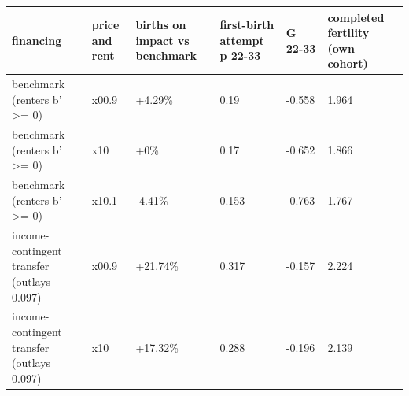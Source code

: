 \begingroup\small
\setlength{\tabcolsep}{3pt}
\renewcommand{\arraystretch}{1.04}
\begin{tabularx}{\linewidth}{XXXXXX}
\toprule
financing & price and rent & births on impact vs benchmark & first-birth attempt p 22-33 & G 22-33 & completed fertility (own cohort) \\
\midrule
benchmark (renters b' \textgreater{}= 0) & x00.9 & +4.29\% & 0.19 & -0.558 & 1.964 \\
benchmark (renters b' \textgreater{}= 0) & x10 & +0\% & 0.17 & -0.652 & 1.866 \\
benchmark (renters b' \textgreater{}= 0) & x10.1 & -4.41\% & 0.153 & -0.763 & 1.767 \\
income-contingent transfer (outlays 0.097) & x00.9 & +21.74\% & 0.317 & -0.157 & 2.224 \\
income-contingent transfer (outlays 0.097) & x10 & +17.32\% & 0.288 & -0.196 & 2.139 \\
\bottomrule
\end{tabularx}
\endgroup
